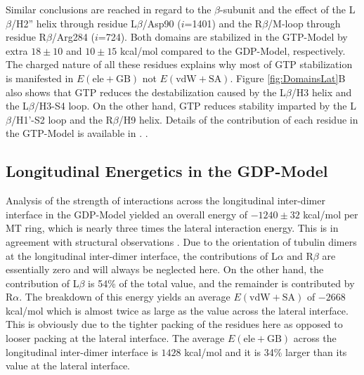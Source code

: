 \documentclass[11pt]{report}
\begin{document}
Similar conclusions are reached in regard to the 
$\beta$-subunit and the effect of the L$\beta$/H2'' helix
through residue L$\beta$/Asp90 ($i$=1401) and the R$\beta$/M-loop 
through residue R$\beta$/Arg284 ($i$=724).
Both domains are stabilized in the GTP-Model
by extra $18\pm10$ and $10\pm15$ kcal/mol compared to the GDP-Model, respectively.  
The charged nature of all these residues explains 
why most of GTP stabilization is manifested
in $E(\text{ele}+\text{GB})$ not $E(\text{vdW}+\text{SA})$.
Figure \ref{fig:DomainsLat}B also shows
that GTP reduces the destabilization caused by the L$\beta$/H3 helix
and the L$\beta$/H3-S4 loop. On the other hand, GTP reduces 
stability imparted by the
L$\beta$/H1'-S2 loop and the R$\beta$/H9 helix.
Details of the contribution of each residue in the 
GTP-Model is
available in \cite{Ayoub2015}.
.

\subsection{Longitudinal Energetics in the GDP-Model}

Analysis of the strength of interactions across the 
longitudinal inter-dimer interface in the GDP-Model yielded
an overall energy of $-1240\pm32$ kcal/mol
per MT ring, which is
nearly three times the lateral interaction 
energy. This is in agreement with structural
observations \cite{Nogales1999}. Due to the orientation of tubulin dimers 
at the longitudinal inter-dimer interface, the contributions 
of L$\alpha$ and R$\beta$ are essentially zero and 
will always be neglected here. On the other hand,
the contribution of L$\beta$ is 54\% of the total value,
and the remainder is contributed by R$\alpha$.
The breakdown of this energy yields an average $E(\text{vdW}+\text{SA})$
of $-2668$ kcal/mol which is almost twice 
as large as the value across the lateral interface. This
is obviously due to the tighter packing of the 
residues here as opposed to looser packing at the
lateral interface.
The average $E(\text{ele}+\text{GB})$ across the longitudinal inter-dimer
interface is $1428$ kcal/mol and it is 34\% larger
than its value at the lateral interface.
\end{document}
